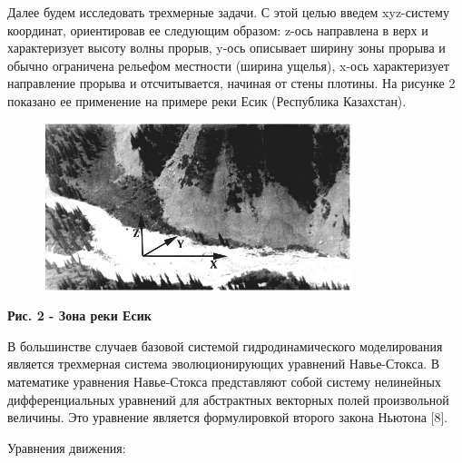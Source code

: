 Далее будем исследовать трехмерные задачи. С этой целью введем
xyz-систему координат, ориентировав ее следующим образом: z-ось
направлена в верх и характеризует высоту волны прорыв, y-ось описывает
ширину зоны прорыва и обычно ограничена рельефом местности (ширина
ущелья), x-ось характеризует направление прорыва и отсчитывается,
начиная от стены плотины. На рисунке 2 показано ее применение на примере
реки Есик (Республика Казахстан).

\begin{figure}[H]
	\centering
	\includegraphics[width=0.8\textwidth]{assets/62}
	\caption*{}
\end{figure}

\textbf{Рис. 2 - Зона реки Есик}

В большинстве случаев базовой системой гидродинамического моделирования
является трехмерная система эволюционирующих уравнений Навье-Стокса. В
математике уравнения Навье-Стокса представляют собой систему нелинейных
дифференциальных уравнений для абстрактных векторных полей произвольной
величины. Это уравнение является формулировкой второго закона Ньютона
{[}8{]}.

Уравнения движения:

